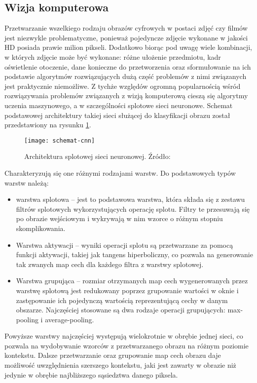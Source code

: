 \subsection{Wizja komputerowa}
Przetwarzanie wszelkiego rodzaju obrazów cyfrowych w postaci zdjęć czy filmów jest niezwykle problematyczne, ponieważ pojedyncze zdjęcie wykonane w jakości HD posiada prawie milion pikseli. Dodatkowo biorąc pod uwagę wiele kombinacji, w których zdjęcie może być wykonane: różne ułożenie przedmiotu, kadr oświetlenie otoczenie, dane konieczne do przetworzenia oraz sformułowanie na ich podstawie algorytmów rozwiązujących dużą część problemów z nimi związanych jest praktycznie niemożliwe. Z tychże względów ogromną popularnością wśród rozwiązywania problemów związanych z wizją komputerową cieszą się algorytmy uczenia maszynowego, a w szczególności splotowe sieci neuronowe. Schemat podstawowej architektury takiej sieci służącej do klasyfikacji obrazu został przedstawiony na rysunku \ref{fig:schemat-cnn}.
\begin{figure}[H]
  \centering
  \texttt{[image: schemat-cnn]}
  \caption{Architektura splotowej sieci neuronowej. Źródło: \cite{WikipediaEN:CNN}}
  \label{fig:schemat-cnn}
\end{figure}
\noindent Charakteryzują się one różnymi rodzajami warstw. Do podstawowych typów warstw należą:
\begin{itemize}
  \item warstwa splotowa -- jest to podstawowa warstwa, która składa się z zestawu filtrów splotowych wykorzystujących operację splotu. Filtry te przesuwają się po obrazie wejściowym i wykrywają w nim wzorce o różnym stopniu skomplikowania.
  \item Warstwa aktywacji -- wyniki operacji splotu są przetwarzane za pomocą funkcji aktywacji, takiej jak tangens hiperboliczny, co pozwala na generowanie tak zwanych map cech dla każdego filtra z warstwy splotowej.
  \item Warstwa grupująca -- rozmiar otrzymanych map cech wygenerowanych przez warstwę splotową jest redukowany poprzez grupowanie wartości w oknie i zastępowanie ich pojedynczą wartością reprezentującą cechy w danym obszarze. Najczęściej stosowane są dwa rodzaje operacji grupujących: max-pooling i average-pooling.
\end{itemize}
Powyższe warstwy najczęściej występują wielokrotnie w obrębie jednej sieci, co pozwala na wydobywanie wzorców z przetwarzanego obrazu na różnym poziomie kontekstu. Dalsze przetwarzanie oraz grupowanie map cech obrazu daje możliwość uwzględnienia szerszego kontekstu, jaki jest zawarty w obrazie niż jedynie w obrębie najbliższego sąsiedztwa danego piksela.
